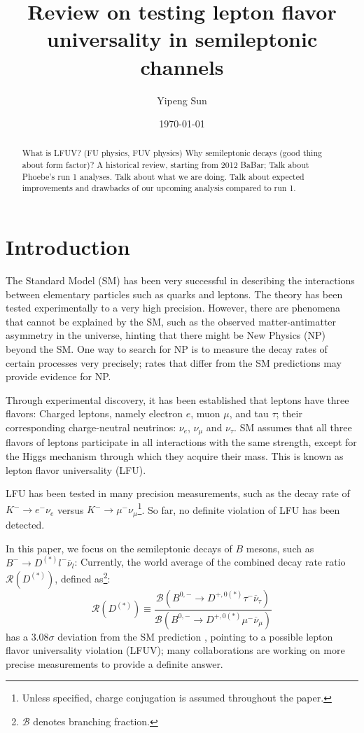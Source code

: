 \documentclass[12pt,letterpaper]{article}
\title{Review on testing lepton flavor universality in semileptonic channels}
\author{Yipeng Sun}
\affil{Department of Physics, University of Maryland}
\date{\today}
\def\RDDst/{\ensuremath{\mathcal{R}(D^{(*)})}}
\begin{document}
\maketitle

\begin{abstract}
    What is LFUV? (FU physics, FUV physics)
    Why semileptonic decays (good thing about form factor)?
    A historical review, starting from 2012 BaBar;
    Talk about Phoebe's run 1 analyses.
    Talk about what we are doing.
    Talk about expected improvements and drawbacks of our upcoming analysis compared
    to run 1.
\end{abstract}

\section{Introduction}
The Standard Model (SM) has been very successful in describing the interactions
between elementary particles such as quarks and leptons.
The theory has been tested experimentally to a very high precision.
However, there are phenomena that cannot be explained by the SM, such as
the observed matter-antimatter asymmetry in the universe, hinting that there might be New Physics (NP) beyond the SM.
One way to search for NP is to measure the decay rates of certain processes
very precisely;
rates that differ from the SM predictions may provide evidence for NP.

Through experimental discovery, it has been established that leptons have three
flavors:
Charged leptons, namely electron $e$, muon $\mu$, and tau $\tau$;
their corresponding charge-neutral neutrinos: $\nu_e$, $\nu_\mu$ and $\nu_\tau$.
SM assumes that all three flavors of leptons participate in all
interactions with the same strength, except for the Higgs mechanism through which
they acquire their mass.
This is known as lepton flavor universality (LFU).

LFU has been tested in many precision measurements, such as the decay rate
of $K^- \rightarrow e^- \nu_e$ versus $K^- \rightarrow \mu^- \nu_\mu$\footnote{
    Unless specified, charge conjugation is assumed throughout the paper.
}.
So far, no definite violation of LFU has been detected.

In this paper, we focus on the semileptonic decays of $B$ mesons, such as
$B^- \rightarrow D^{(*)} l^- \overline{\nu}_l$:
Currently, the world average of the combined decay rate ratio $\RDDst/$,
defined as\footnote{
    $\mathcal{B}$ denotes branching fraction.
}:
\begin{equation}
    \RDDst/ \equiv \frac{
        \mathcal{B}\left(
            B^{0,-} \rightarrow D^{+,0(*)} \tau^- \overline{\nu}_\tau
        \right)
    }{
        \mathcal{B}\left(
            B^{0,-} \rightarrow D^{+,0(*)} \mu^- \overline{\nu}_\mu
        \right)
    }
\end{equation}
has a $3.08\sigma$ deviation from the SM prediction \cite{HFLAV:2019}, pointing
to a possible lepton flavor universality violation (LFUV);
many collaborations are working on more precise measurements to provide a
definite answer.
\end{document}
